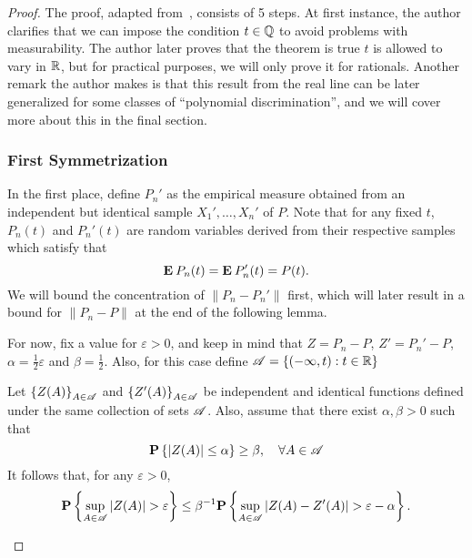 \begin{proof}
  The proof, adapted from~\cite{pollard1984convergence}, consists of 5 steps. At first instance, the author clarifies that we can impose the condition $t\in \Q$ to avoid problems with measurability. The author later proves that the theorem is true $t$ is allowed to vary in $\R$, but for practical purposes, we will only prove it for rationals. Another remark the author makes is that this result from the real line can be later generalized for some classes of ``polynomial discrimination'', and we will cover more about this in the final section.

  \subsubsection*{First Symmetrization}
  In the first place, define $P_n'$ as the empirical measure obtained from an independent but identical sample $X_1',\ldots, X_n'$ of $P$. Note that for any fixed $t$, $P_n(t)$ and $P_n'(t)$ are random variables derived from their respective samples which satisfy that
  \[ \E P_n(t) = \E P_n'(t) = P(t). \] 
  We will bound the concentration of $\|P_n- P_n'\|$ first, which will later result in a bound for $\|P_n - P\|$ at the end of the following lemma.

  \vspace*{1em}

  For now, fix a value for $\varepsilon > 0$, and keep in mind that $Z = P_n - P$, $Z' = P_n' - P$, $\alpha = \frac{1}{2}\varepsilon$ and $\beta = \frac{1}{2}$. Also, for this case define $\AA = \{(-\infty, t) : t\in \R\}$

  \begin{lemma}\label{gc:l1}
    Let ${\{Z(A)\}}_{A\in \AA}$ and ${\{Z'(A)\}}_{A\in \AA}$ be independent and identical functions defined under the same collection of sets $\AA$. Also, assume that there exist $\alpha, \beta > 0$ such that
    \[ \P\left\{|Z(A)| \leq \alpha \right\} \geq \beta, \hspace*{1em} \forall A \in \AA \]
    It follows that, for any $\varepsilon > 0$,
    \[  \P\left\{\sup_{A\in \AA} |Z(A)| > \varepsilon \right\} \leq \beta^{-1} \P\left\{\sup_{A\in \AA} |Z(A)-Z'(A)| > \varepsilon - \alpha \right\}. \]     
  \end{lemma}


\end{proof}
